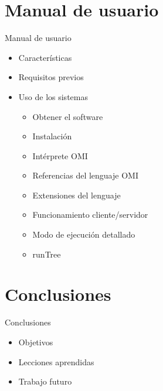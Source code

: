 \documentclass[spanish]{beamer}
\begin{document}
\section{Manual de usuario}
\begin{frame}{Manual de usuario}
   \begin{itemize}
         \item Características
         \item Requisitos previos
         \item Uso de los sistemas
         \begin {itemize}
            \item Obtener el software
            \item Instalación
            \item Intérprete  OMI
            \item Referencias del lenguaje OMI
            \item Extensiones del lenguaje
            \item Funcionamiento cliente/servidor
            \item Modo de ejecución detallado
            \item runTree
         \end{itemize}
   \end{itemize}
\end{frame}

\section{Conclusiones}
\begin{frame}{Conclusiones}
   \begin{itemize}
         \item Objetivos
         \item Lecciones aprendidas
         \item Trabajo futuro
   \end{itemize}
\end{frame}
\end{document}
